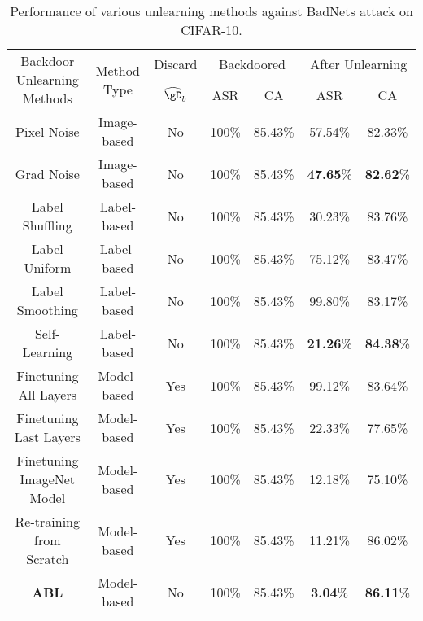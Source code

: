 \begin{table}[!htbp]
\renewcommand{\arraystretch}{1.1}
\renewcommand\tabcolsep{3.0pt}
\small
\centering
\caption{Performance of various unlearning methods against BadNets attack on CIFAR-10. }
 \label{tab3}
\begin{tabular}{c|c|lc|cccc}
\toprule
\multirow{2}{*}{Backdoor Unlearning Methods} & \multicolumn{2}{c}{\multirow{2}{*}{Method Type}} & Discard & \multicolumn{2}{c}{Backdoored} & \multicolumn{2}{c}{After Unlearning} \\ \cline{5-8} 
 & \multicolumn{2}{c}{} & $\widehat{\gD}_b$ & ASR & CA & ASR & CA \\ \hline
Pixel Noise & \multicolumn{2}{c}{Image-based} & No & 100\% & 85.43\% & 57.54\% & 82.33\% \\
Grad Noise & \multicolumn{2}{c}{Image-based} & No & 100\% & 85.43\% & \textbf{47.65}\% & \textbf{82.62}\% \\ \hline
Label Shuffling & \multicolumn{2}{c}{Label-based} & No & 100\% & 85.43\% & 30.23\% & 83.76\% \\
Label Uniform & \multicolumn{2}{c}{Label-based} & No & 100\% & 85.43\% & 75.12\% & 83.47\% \\
Label Smoothing & \multicolumn{2}{c}{Label-based} & No & 100\% & 85.43\% & 99.80\% & 83.17\% \\
Self-Learning & \multicolumn{2}{c}{Label-based} & No & 100\% & 85.43\% & \textbf{21.26}\% & \textbf{84.38}\% \\ \hline
Finetuning All Layers & \multicolumn{2}{c}{Model-based} & Yes & 100\% & 85.43\% & 99.12\% & 83.64\% \\
Finetuning Last Layers & \multicolumn{2}{c}{Model-based} & Yes & 100\% & 85.43\% & 22.33\% & 77.65\% \\
Finetuning ImageNet Model & \multicolumn{2}{c}{Model-based} & Yes & 100\% & 85.43\% & 12.18\% & 75.10\% \\
Re-training from Scratch & \multicolumn{2}{c}{Model-based} & Yes & 100\% & 85.43\% & 11.21\% & 86.02\% \\ \hline
\textbf{ABL} & \multicolumn{2}{c}{Model-based} & No & 100\% & 85.43\% & \textbf{3.04}\% & \textbf{86.11}\%\\
\bottomrule
\end{tabular}
\vspace{-0.1in}
\end{table}

